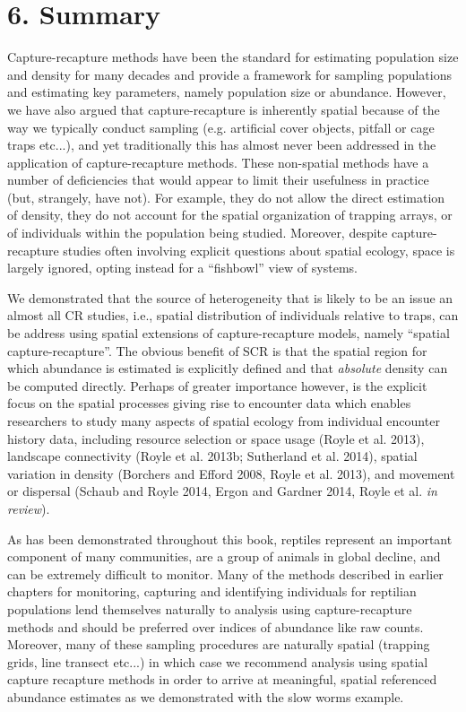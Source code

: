 \documentclass{book}
\begin{document}
\section*{6. Summary}

Capture-recapture methods have been the standard for estimating population size and density for many decades and provide a framework for sampling populations and estimating key parameters, namely population size or abundance. However, we have also argued that capture-recapture is inherently spatial because of the way we typically conduct sampling (e.g. artificial cover objects, pitfall or cage traps etc...), and yet traditionally this has almost never been addressed in the application of capture-recapture methods. These non-spatial methods have a number of deficiencies that would appear to limit their usefulness in practice (but, strangely, have not). For example, they do not allow the direct estimation of density, they do not account for the spatial organization of trapping arrays, or of individuals within the population being studied. Moreover, despite capture-recapture studies often involving
explicit questions about spatial ecology, space is largely ignored, opting instead for a ``fishbowl'' view of systems.

We demonstrated that the source of heterogeneity that is likely to be an issue an almost all CR studies, i.e., spatial distribution of individuals relative to traps, can be address using spatial extensions of capture-recapture models, namely ``spatial capture-recapture''. The obvious benefit of SCR is that the spatial region for which abundance is estimated is explicitly defined and that \textit{absolute} density can be computed directly. Perhaps of greater importance however, is the explicit focus on the spatial processes giving rise to encounter data which enables researchers to study many aspects of spatial ecology from individual encounter history data, including resource selection or space usage (Royle et al. 2013), landscape connectivity (Royle et al. 2013b; Sutherland et al. 2014), spatial variation in density (Borchers and Efford 2008, Royle et al. 2013), and movement or dispersal (Schaub and Royle 2014, Ergon and Gardner 2014, Royle et al. {\it in review}).

As has been demonstrated throughout this book, reptiles represent an important component of many communities, are a group of animals in global decline, and can be extremely difficult to monitor. Many of the methods described in earlier chapters for monitoring, capturing and identifying individuals for reptilian populations lend themselves naturally to analysis using capture-recapture methods and should be preferred over indices of abundance like raw counts. Moreover, many of these sampling procedures are naturally spatial (trapping grids, line transect etc...) in which case we recommend analysis using spatial capture recapture methods in order to arrive at meaningful, spatial referenced abundance estimates as we demonstrated with the slow worms example.
\end{document}
